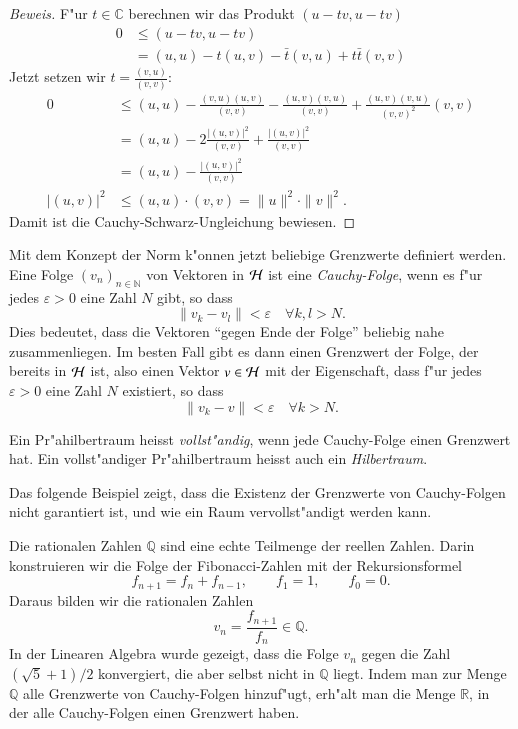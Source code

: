 \begin{proof}[Beweis]
F"ur $t\in\mathbb C$ berechnen wir das Produkt $(u-tv, u-tv)$
\begin{align*}
0&\le (u-tv,u-tv)\\
 &=   (u,u) - t(u,v) - \bar t(v,u) +   t\bar t(v,v) 
\end{align*}
Jetzt setzen wir $t=\frac{(v,u)}{(v,v)}$:
\begin{align*}
0&\le (u,u) - \frac{(v,u)(u,v)}{(v,v)} - \frac{(u,v)(v,u)}{(v,v)} + \frac{(u,v)(v,u)}{(v,v)^2}(v,v)\\
 &=(u,u) - 2\frac{|(u,v)|^2}{(v,v)} +\frac{|(u,v)|^2}{(v,v)}\\
 &=(u,u) -\frac{|(u,v)|^2}{(v,v)}\\
|(u,v)|^2&\le (u,u)\cdot (v,v) = \|u\|^2\cdot \|v\|^2.
\end{align*}
Damit ist die Cauchy-Schwarz-Ungleichung bewiesen.
\end{proof}

Mit dem Konzept der Norm k"onnen jetzt beliebige Grenzwerte 
definiert werden.
Eine Folge $(v_n)_{n\in\mathbb N}$ von Vektoren in $\cal H$ ist eine
{\em Cauchy-Folge}, wenn es f"ur jedes $\varepsilon>0$ eine Zahl
$N$ gibt, so dass
\[
\|v_k-v_l\| <\varepsilon\quad\forall k,l>N.
\]
Dies bedeutet, dass die Vektoren ``gegen Ende der Folge'' beliebig
nahe zusammenliegen. 
Im besten Fall gibt es dann einen Grenzwert der Folge, der bereits in
$\cal H$ ist, also einen Vektor $v\in\cal H$ mit der Eigenschaft,
dass f"ur jedes $\varepsilon > 0$ eine Zahl $N$ existiert, so dass
\[
\|v_k-v\| < \varepsilon\quad\forall k>N.
\]

\begin{definition}
Ein Pr"ahilbertraum heisst {\em vollst"andig}, wenn jede Cauchy-Folge einen
Grenzwert hat.
Ein vollst"andiger Pr"ahilbertraum heisst auch ein {\em Hilbertraum}.
\end{definition}

Das folgende Beispiel zeigt, dass die Existenz der Grenzwerte von
Cauchy-Folgen nicht garantiert ist, und wie ein Raum vervollst"andigt
werden kann.

\begin{beispiel}
Die rationalen Zahlen $\mathbb Q$ sind eine echte Teilmenge der
reellen Zahlen.
Darin konstruieren wir die Folge der Fibonacci-Zahlen mit der 
Rekursionsformel
\[
f_{n+1}=f_n+f_{n-1},\qquad f_1=1, \qquad f_0=0.
\]
%
Daraus bilden wir die rationalen Zahlen
\[
v_n=\frac{f_{n+1}}{f_n}\in\mathbb Q.
\]
In der Linearen Algebra wurde gezeigt, dass die Folge $v_n$ gegen
die Zahl $(\sqrt{5}+1)/2$ konvergiert, die aber selbst nicht in
$\mathbb Q$ liegt. Indem man zur Menge $\mathbb Q$ alle Grenzwerte
von Cauchy-Folgen hinzuf"ugt, erh"alt man die Menge $\mathbb R$, in der
alle Cauchy-Folgen einen Grenzwert haben.
\end{beispiel}

